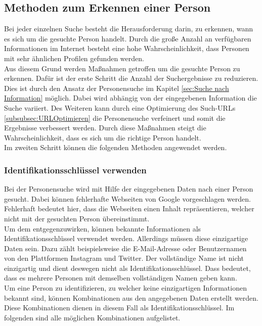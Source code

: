 	\subsection{Methoden zum Erkennen einer Person}
	\label{sec:WannhandeltessichumdiegesuchtePerson}
	Bei jeder einzelnen Suche besteht die Herausforderung darin, zu erkennen, wann es sich um die gesuchte Person handelt. Durch die große Anzahl an verfügbaren Informationen im Internet besteht eine hohe Wahrscheinlichkeit, dass Personen mit sehr ähnlichen Profilen gefunden werden.\\
	Aus diesem Grund werden Maßnahmen getroffen um die gesuchte Person zu erkennen. Dafür ist der erste Schritt die Anzahl der Suchergebnisse zu reduzieren. Dies ist durch den Ansatz der Personensuche im Kapitel \ref{sec:Suche nach Information} möglich. Dabei wird abhängig von der eingegebenen Information die Suche variiert. Des Weiteren kann durch eine Optimierung des Such-URLs \ref{subsubsec:URLOptimieren} die Personensuche verfeinert und somit die Ergebnisse verbessert werden. Durch diese Maßnahmen steigt die Wahrscheinlichkeit, dass es sich um die richtige Person handelt.\\
	Im zweiten Schritt können die folgenden Methoden angewendet werden.
	
		\subsubsection{Identifikationsschlüssel verwenden}
		\label{subsec:VorlaeufigInhaltskontrolle}
		Bei der Personensuche wird mit Hilfe der eingegebenen Daten nach einer Person gesucht. Dabei können fehlerhafte Webseiten von Google vorgeschlagen werden. Fehlerhaft bedeutet hier, dass die Webseiten einen Inhalt repräsentieren, welcher nicht mit der gesuchten Person übereinstimmt.\\ 
		Um dem entgegenzuwirken, können bekannte Informationen als Identifikationsschlüssel verwendet werden. Allerdings müssen diese einzigartige Daten sein. Dazu zählt beispielsweise die E-Mail-Adresse oder Benutzernamen von den Plattformen Instagram und Twitter. Der vollständige Name ist nicht einzigartig und dient deswegen nicht als Identifikationsschlüssel. Dass bedeutet, dass es mehrere Personen mit demselben vollständigen Namen geben kann.\\
		Um eine Person zu identifizieren, zu welcher keine einzigartigen Informationen bekannt sind, können Kombinationen aus den angegebenen Daten erstellt werden. Diese Kombinationen dienen in diesem Fall als Identifikationsschlüssel. Im folgenden sind alle möglichen Kombinationen aufgelistet.
		
